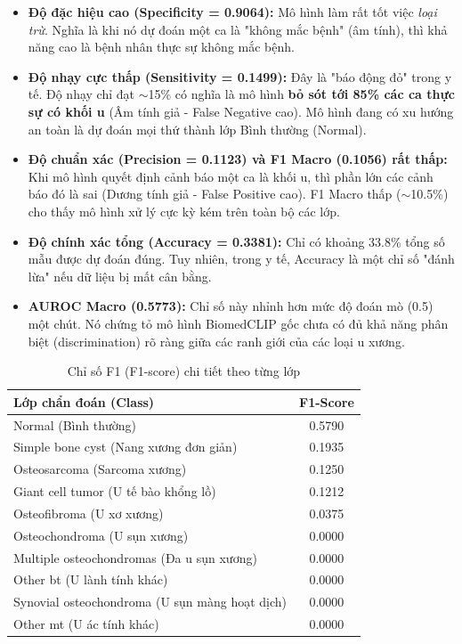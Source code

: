 \begin{itemize}
    \item \textbf{Độ đặc hiệu cao (Specificity = 0.9064):} Mô hình làm rất tốt việc \textit{loại trừ}. Nghĩa là khi nó dự đoán một ca là "không mắc bệnh" (âm tính), thì khả năng cao là bệnh nhân thực sự không mắc bệnh.
    \item \textbf{Độ nhạy cực thấp (Sensitivity = 0.1499):} Đây là "báo động đỏ" trong y tế. Độ nhạy chỉ đạt $\sim$15\% có nghĩa là mô hình \textbf{bỏ sót tới 85\% các ca thực sự có khối u} (Âm tính giả - False Negative cao). Mô hình đang có xu hướng an toàn là dự đoán mọi thứ thành lớp Bình thường (Normal).
    \item \textbf{Độ chuẩn xác (Precision = 0.1123) và F1 Macro (0.1056) rất thấp:} Khi mô hình quyết định cảnh báo một ca là khối u, thì phần lớn các cảnh báo đó là sai (Dương tính giả - False Positive cao). F1 Macro thấp ($\sim$10.5\%) cho thấy mô hình xử lý cực kỳ kém trên toàn bộ các lớp.
    \item \textbf{Độ chính xác tổng (Accuracy = 0.3381):} Chỉ có khoảng 33.8\% tổng số mẫu được dự đoán đúng. Tuy nhiên, trong y tế, Accuracy là một chỉ số "đánh lừa" nếu dữ liệu bị mất cân bằng.
    \item \textbf{AUROC Macro (0.5773):} Chỉ số này nhỉnh hơn mức độ đoán mò (0.5) một chút. Nó chứng tỏ mô hình BiomedCLIP gốc chưa có đủ khả năng phân biệt (discrimination) rõ ràng giữa các ranh giới của các loại u xương.
\end{itemize}

\begin{table}[htbp]
\centering
\caption{Chỉ số F1 (F1-score) chi tiết theo từng lớp}
\label{tab:f1_per_class}
\begin{tabular}{|l|c|}
\hline
\textbf{Lớp chẩn đoán (Class)} & \textbf{F1-Score} \\
\hline
Normal (Bình thường) & 0.5790 \\
Simple bone cyst (Nang xương đơn giản) & 0.1935 \\
Osteosarcoma (Sarcoma xương) & 0.1250 \\
Giant cell tumor (U tế bào khổng lồ) & 0.1212 \\
Osteofibroma (U xơ xương) & 0.0375 \\
Osteochondroma (U sụn xương) & 0.0000 \\
Multiple osteochondromas (Đa u sụn xương) & 0.0000 \\
Other bt (U lành tính khác) & 0.0000 \\
Synovial osteochondroma (U sụn màng hoạt dịch) & 0.0000 \\
Other mt (U ác tính khác) & 0.0000 \\
\hline
\end{tabular}
\end{table}


